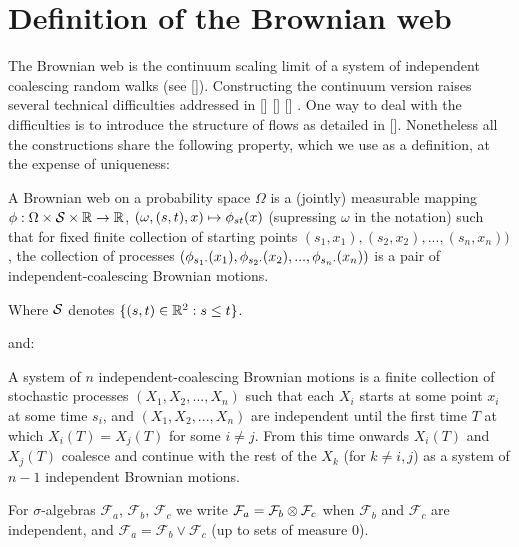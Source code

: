 {
\section{Definition of the Brownian web}

The Brownian web is the continuum scaling limit of a system of
independent coalescing random walks (see []).  Constructing the
continuum version raises several technical difficulties addressed in
[] [] [] . One way to deal with the difficulties is to introduce the
structure of flows as detailed in [].  Nonetheless all the
constructions share the following property, which we use as a
definition, at the expense of uniqueness:

\begin{definition}
  A Brownian web on a probability space $\Omega$ is a (jointly)
  measurable mapping $\phi : \Omega \times \mathcal{S} \times \mathbb{R}
  \to \mathbb{R}$, $(\omega, (s, t), x) \mapsto \phi_{{s}{t}}(x)$ (supressing
  $\omega$ in the notation) such that for fixed finite collection of
  starting points $(s_1, x_1),(s_2, x_2),...,(s_n, x_n))$, the
  collection of processes $(\phi_{{s_1}{\cdot}}(x_1),
  \phi_{{s_2}{\cdot}}(x_2),...,\phi_{{s_n}{\cdot}}(x_n))$ is a pair of
  independent-coalescing Brownian motions.
\end{definition}

\begin{notation}
  Where $\mathcal{S}$ denotes $\{(s, t) \in \mathbb{R}^2 : s \le t\}$.
\end{notation}

and:

\begin{definition}
  \label{def:independent-coalescing-bm}
  \newcommand{\maxsym}{\vee}
  A system of $n$ independent-coalescing Brownian motions is a finite
  collection of stochastic processes $(X_1, X_2,...,X_n)$ such that
  each $X_i$ starts at some point $x_i$ at some time $s_i$, and $(X_1,
  X_2,...,X_n)$ are independent until the first time $T$ at which
  $X_i(T)=X_j(T)$ for some $i\neq j$. From this time onwards $X_i(T)$
  and $X_j(T)$ coalesce and continue with the rest of the $X_k$ (for
  $k\neq i,j$) as a system of $n-1$ independent Brownian motions.
\end{definition}

\begin{notation}
  \newcommand{\F}{\mathcal{F}}

  For $\sigma$-algebras $\F_a$, $\F_b$, $\F_c$ we write $\F_a = \F_b
  \tensor \F_c$ when $\F_b$ and $\F_c$ are independent, and $\F_a =
  \F_b \vee \F_c$ (up to sets of measure $0$).


\end{notation}}
